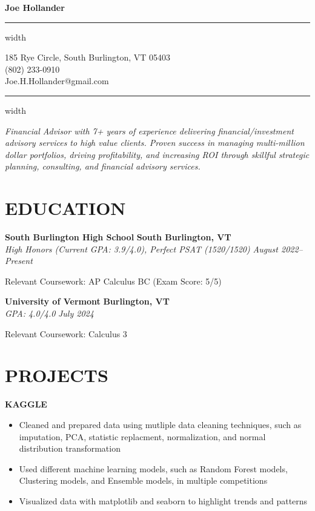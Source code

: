 \documentclass[11pt,letterpaper]{article}
\newcommand{\name}[1]{
  \begin{center}
    \Huge\textbf{#1}
  \end{center}
  \vspace{-0.5em}
  \hrule height 0.4pt width \textwidth
  \vspace{0.5em}
}
\newcommand{\contact}[3]{
  \begin{center}
    #1 \\
    #2 \\
    #3
  \end{center}
  \vspace{-0.5em}
  \hrule height 0.4pt width \textwidth
  \vspace{0.5em}
}
\newcommand{\role}[4]{
  \begin{center}
  \textbf{#1} \hfill \textbf{#2} \\
  \textit{#3} \hfill \textit{#4}
  \end{center}
}
\begin{document}
\name{Joe Hollander}
\vspace{-0.5em}
\contact{185 Rye Circle, South Burlington, VT 05403}{(802) 233-0910}{Joe.H.Hollander@gmail.com}

\vspace{-0.5em}
\begin{center}
\textit{Financial Advisor with 7+ years of experience delivering financial/investment advisory services to high value clients. Proven success in managing multi-million dollar portfolios, driving profitability, and increasing ROI through skillful strategic planning, consulting, and financial advisory services.}
\end{center}

\section{EDUCATION}

\vspace{0.5em}
\role{South Burlington High School}{South Burlington, VT}{High Honors (Current GPA: 3.9/4.0), Perfect PSAT (1520/1520)}{August 2022--Present}   
\begin{flushleft}
Relevant Coursework: AP Calculus BC (Exam Score: 5/5)
\end{flushleft}

\role{University of Vermont}{Burlington, VT}{GPA: 4.0/4.0}{July 2024}
\begin{flushleft}
  Relevant Coursework: Calculus 3
  \end{flushleft}


\section{PROJECTS}
\vspace{1em}

\begin{flushleft}
  \textbf{KAGGLE}
  \begin{itemize}[leftmargin=*,nosep]
    \item Cleaned and prepared data using mutliple data cleaning techniques, such as imputation, PCA, statistic replacment, normalization, and normal distribution transformation
    \item Used different machine learning models, such as Random Forest models, Clustering models, and Ensemble models, in multiple competitions
    \item Visualized data with matplotlib and seaborn to highlight trends and patterns
  \end{itemize}
\end{flushleft}
\end{document}
